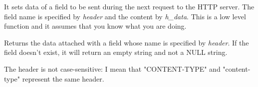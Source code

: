 


It sets data of a field to be sent during the next request to the HTTP server. The field
name is specified by {\it header} and the content by {\it h\_data}.
This is a low level function and it assumes that you know what you are doing.



Returns the data attached with a field whose name is specified by {\it header}.
If the field doesn't exist, it will return an empty string and not a NULL string.


The header is not case-sensitive: I mean that "CONTENT-TYPE" and "content-type" 
represent the same header.

